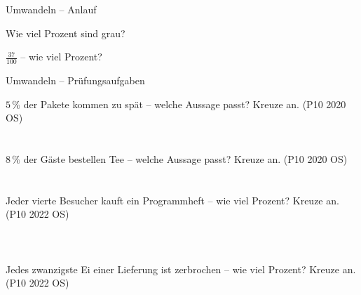 \setcounter{aufgabe}{22}

\begin{aufgabe}{Umwandeln – Anlauf}
\begin{teile}
\teil Wie viel Prozent sind grau?

\teil $\frac{37}{100}$ – wie viel Prozent? \leerfeld[\%]
\end{teile}
\end{aufgabe}

\begin{aufgabe}{Umwandeln – Prüfungsaufgaben}
\begin{teile}
\teil $5\,\%$ der Pakete kommen zu spät – welche Aussage passt? Kreuze an. \hfill (P10 2020 OS)\\ \\ \\ 
\teil $8\,\%$ der Gäste bestellen Tee – welche Aussage passt? Kreuze an. \hfill (P10 2020 OS)\\ \\ \\ 
\teil Jeder vierte Besucher kauft ein Programmheft – wie viel Prozent? Kreuze an. \hfill (P10 2022 OS)\\ \\ \\ \\ 
\teil Jedes zwanzigste Ei einer Lieferung ist zerbrochen – wie viel Prozent? Kreuze an. \hfill (P10 2022 OS)\\ \\ \\ \\ 
\end{teile}
\end{aufgabe}

